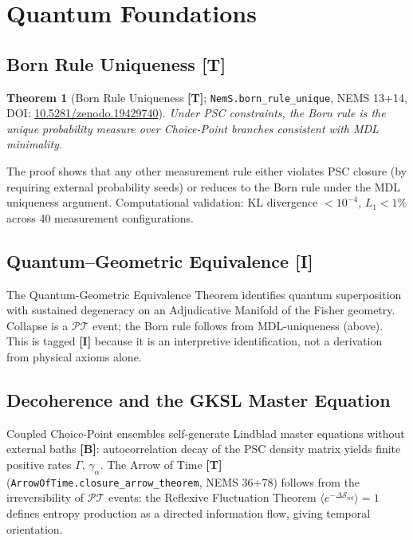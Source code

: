 \documentclass[11pt]{article}
\newcommand{\PT}{\mathcal{P}\mathcal{T}}
\newcommand{\tagT}{\textbf{[T]}}
\newcommand{\tagB}{\textbf{[B]}}
\newcommand{\tagI}{\textbf{[I]}}
\theoremstyle{plain}
\newtheorem{theorem}{Theorem}[section]
\theoremstyle{definition}
\theoremstyle{remark}
\begin{document}
\section{Quantum Foundations}
\label{sec:quantum}

\subsection{Born Rule Uniqueness \tagT{}}

\begin{theorem}[Born Rule Uniqueness \tagT{}; \texttt{NemS.born\_rule\_unique}, NEMS 13+14,
DOI: \href{https://doi.org/10.5281/zenodo.19429740}{10.5281/zenodo.19429740}]
Under PSC constraints, the Born rule is the unique probability measure
over Choice-Point branches consistent with MDL minimality.
\end{theorem}

\noindent The proof shows that any other measurement rule either violates PSC closure
(by requiring external probability seeds) or reduces to the Born rule under
the MDL uniqueness argument.
Computational validation: KL divergence $< 10^{-4}$, $L_1 < 1\%$ across 40 measurement configurations.

\subsection{Quantum--Geometric Equivalence \tagI{}}

The Quantum-Geometric Equivalence Theorem identifies quantum superposition with
sustained degeneracy on an Adjudicative Manifold of the Fisher geometry.
Collapse is a $\PT$ event; the Born rule follows from MDL-uniqueness (above).
This is tagged \tagI{} because it is an interpretive identification,
not a derivation from physical axioms alone.

\subsection{Decoherence and the GKSL Master Equation}

Coupled Choice-Point ensembles self-generate Lindblad master equations
without external baths \tagB{}:
autocorrelation decay of the PSC density matrix yields finite positive rates $\Gamma$, $\gamma_\alpha$.
The Arrow of Time \tagT{} (\texttt{ArrowOfTime.closure\_arrow\_theorem}, NEMS 36+78)
follows from the irreversibility of $\PT$ events: the Reflexive Fluctuation Theorem
$\langle e^{-\Delta\mathcal{S}_\mathrm{ref}}\rangle = 1$ defines entropy production
as a directed information flow, giving temporal orientation.
\end{document}
